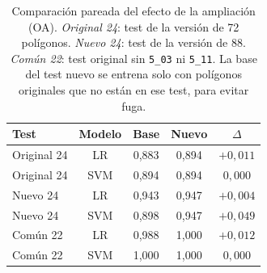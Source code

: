 \begin{table}[htbp]
 \centering
 \small
 \setlength{\tabcolsep}{4pt}
 \caption{Comparación pareada del efecto de la ampliación (OA). \emph{Original 24}: test de la versión de 72 polígonos. \emph{Nuevo 24}: test de la versión de 88. \emph{Común 22}: test original sin \texttt{5\_03} ni \texttt{5\_11}. La base del test nuevo se entrena solo con polígonos originales que no están en ese test, para evitar fuga.}
 \label{tab:comparacion_pareada}
 \begin{tabular}{lcccc}
  \toprule
  Test & Modelo & Base & Nuevo & $\Delta$ \\
  \midrule
  Original 24 & LR & 0{,}883 & 0{,}894 & $+0{,}011$ \\
  Original 24 & SVM & 0{,}894 & 0{,}894 & $0{,}000$ \\
  Nuevo 24 & LR & 0{,}943 & 0{,}947 & $+0{,}004$ \\
  Nuevo 24 & SVM & 0{,}898 & 0{,}947 & $+0{,}049$ \\
  Común 22 & LR & 0{,}988 & 1{,}000 & $+0{,}012$ \\
  Común 22 & SVM & 1{,}000 & 1{,}000 & $0{,}000$ \\
  \bottomrule
 \end{tabular}
\end{table}
